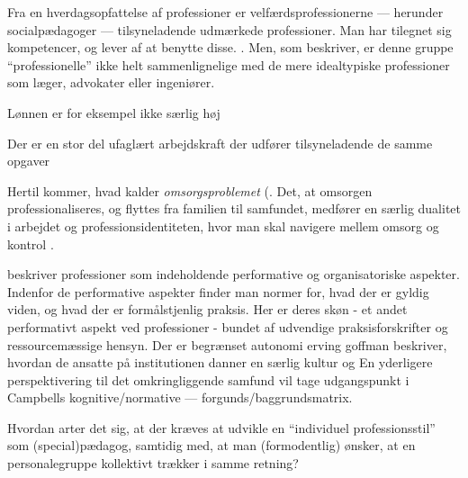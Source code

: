 Fra en hverdagsopfattelse af professioner er velfærdsprofessionerne — herunder socialpædagoger — tilsyneladende udmærkede professioner. Man har tilegnet sig kompetencer, og lever af at benytte disse. \autocite[ss. 443-444]{frederiksenVelfaerdsprofessionerMellemOmsorg2017}.
Men, som \citeauthor{frederiksenVelfaerdsprofessionerMellemOmsorg2017} beskriver, er denne gruppe “professionelle” ikke helt sammenlignelige med de mere idealtypiske professioner som læger, advokater eller ingeniører.

Lønnen er for eksempel ikke særlig høj

Der er en stor del ufaglært arbejdskraft der udfører tilsyneladende de samme opgaver 


Hertil kommer, hvad \citeauthor{frederiksenVelfaerdsprofessionerMellemOmsorg2017} kalder \textit{omsorgsproblemet} (.
Det, at omsorgen professionaliseres, og flyttes fra familien til samfundet, medfører en særlig dualitet i arbejdet og professionsidentiteten, hvor man skal navigere mellem omsorg og kontrol \autocite[s. 461]{frederiksenVelfaerdsprofessionerMellemOmsorg2017}.

\citeauthor{molanderProfesjonsstudierIntroduksjon2008} beskriver professioner som indeholdende performative og organisatoriske aspekter.
Indenfor de performative aspekter finder man normer for, hvad der er gyldig viden, og hvad der er formålstjenlig praksis.
Her er deres skøn - et andet performativt aspekt ved professioner - bundet af udvendige praksisforskrifter og ressourcemæssige hensyn.
Der er begrænset autonomi
erving goffman beskriver, hvordan de ansatte på institutionen danner en særlig kultur og 
En yderligere perspektivering til det omkringliggende samfund 
vil tage udgangspunkt i Campbells kognitive/normative — forgunds/baggrundsmatrix.

Hvordan arter det sig, at der kræves at udvikle en “individuel professionsstil” som (special)pædagog, samtidig med, at man (formodentlig) ønsker, at en personalegruppe kollektivt trækker i samme retning?


